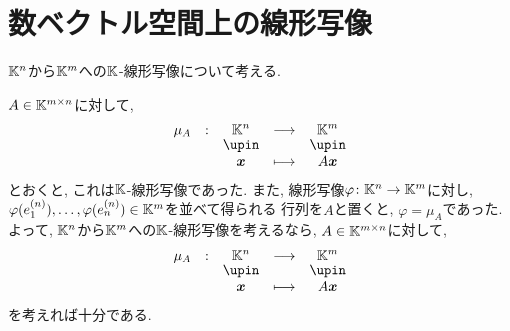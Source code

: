 \section{数ベクトル空間上の線形写像}
$\mathbb{K}^n$から$\mathbb{K}^m$への$\mathbb{K}$-線形写像について考える.


$A\in\mathbb{K}^{m\times n}$に対して,
\begin{align*}
  \shazo{\mu_A}{\KK^n}{\KK^m}
        {\xx}
        {A\xx}
\end{align*}
とおくと, これは$\mathbb{K}$-線形写像であった.
また, 線形写像$\varphi\colon \mathbb{K}^n\to \mathbb{K}^m$に対し,
$\varphi(e^{(n)}_1),\ldots,\varphi(e^{(n)}_n)\in\mathbb{K}^m$を並べて得られる
行列を$A$と置くと,
$\varphi=\mu_A$であった.
よって, 
$\mathbb{K}^n$から$\mathbb{K}^m$への$\mathbb{K}$-線形写像を考えるなら,
$A\in\mathbb{K}^{m\times n}$に対して,
\begin{align*}
  \shazo{\mu_A}{\KK^n}{\KK^m}
        {\xx}
        {A\xx}
\end{align*}
を考えれば十分である.

